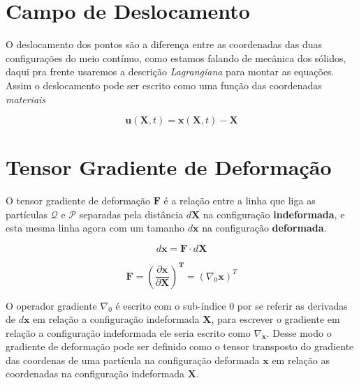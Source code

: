 \section{Campo de Deslocamento}
O deslocamento dos pontos são a diferença entre as coordenadas das duas configurações do meio contínuo, como estamos falando de mecânica dos sólidos, daqui pra frente usaremos a descrição \textit{Lagrangiana} para montar as equações. Assim o deslocamento pode ser escrito como uma função das coordenadas \textit{materiais}

\begin{equation}
	\mathbf{u}(\mathbf{X}, t) = \mathbf{x}(\mathbf{X}, t) - \mathbf{X}
	\label{dispX}
\end{equation}


\section{Tensor Gradiente de Deformação}
O tensor gradiente de deformação $\mathbf{F}$ é a relação entre a linha que liga as partículas $\mathcal{Q}$  e $\mathcal{P}$ separadas pela distância $d\mathbf{X}$ na configuração \textbf{indeformada}, e esta mesma linha agora com um tamanho $d\mathbf{x}$ na configuração \textbf{deformada}.  

\begin{equation}
	d\mathbf{x} = \mathbf{F} \cdot d\mathbf{X}
\end{equation}

\begin{equation}
	\mathbf{F} = (\frac{\partial\mathbf{x}}{\partial\mathbf{X}})^\mathbf{T} = (\nabla_{0}\mathbf{x})^T
	\label{Fdef}
\end{equation}

O operador gradiente $\nabla_{0}$ é escrito com o sub-índice 0 por se referir as derivadas de $d\mathbf{x}$ em relação a configuração indeformada $\mathbf{X}$, para escrever o gradiente em relação a configuração indeformada ele seria escrito como $\nabla_{\mathbf{x}}$. Desse modo o gradiente de deformação pode ser definido como o tensor transposto do gradiente das coordenas de uma partícula na configuração deformada $\mathbf{x}$ em relação as coordenadas na configuração indeformada $\mathbf{X}$.


